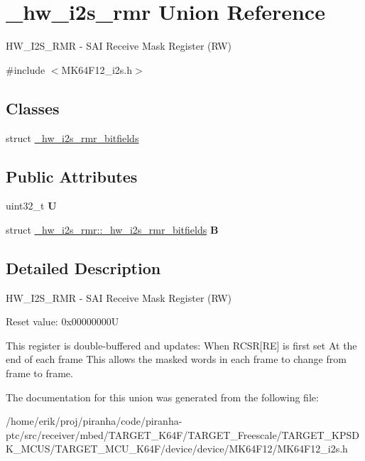\hypertarget{union__hw__i2s__rmr}{}\section{\+\_\+hw\+\_\+i2s\+\_\+rmr Union Reference}
\label{union__hw__i2s__rmr}


H\+W\+\_\+\+I2\+S\+\_\+\+R\+MR -\/ S\+AI Receive Mask Register (RW)  




{\ttfamily \#include $<$M\+K64\+F12\+\_\+i2s.\+h$>$}

\subsection*{Classes}
\begin{DoxyCompactItemize}
\item 
struct \hyperlink{struct__hw__i2s__rmr_1_1__hw__i2s__rmr__bitfields}{\+\_\+hw\+\_\+i2s\+\_\+rmr\+\_\+bitfields}
\end{DoxyCompactItemize}
\subsection*{Public Attributes}
\begin{DoxyCompactItemize}
\item 
uint32\+\_\+t {\bfseries U}\hypertarget{union__hw__i2s__rmr_a3553bafa8137608bc4874e0afd4a54c0}{}\label{union__hw__i2s__rmr_a3553bafa8137608bc4874e0afd4a54c0}

\item 
struct \hyperlink{struct__hw__i2s__rmr_1_1__hw__i2s__rmr__bitfields}{\+\_\+hw\+\_\+i2s\+\_\+rmr\+::\+\_\+hw\+\_\+i2s\+\_\+rmr\+\_\+bitfields} {\bfseries B}\hypertarget{union__hw__i2s__rmr_a1937cc447034b6cd1c011da008498b1c}{}\label{union__hw__i2s__rmr_a1937cc447034b6cd1c011da008498b1c}

\end{DoxyCompactItemize}


\subsection{Detailed Description}
H\+W\+\_\+\+I2\+S\+\_\+\+R\+MR -\/ S\+AI Receive Mask Register (RW) 

Reset value\+: 0x00000000U

This register is double-\/buffered and updates\+: When R\+C\+SR\mbox{[}RE\mbox{]} is first set At the end of each frame This allows the masked words in each frame to change from frame to frame. 

The documentation for this union was generated from the following file\+:\begin{DoxyCompactItemize}
\item 
/home/erik/proj/piranha/code/piranha-\/ptc/src/receiver/mbed/\+T\+A\+R\+G\+E\+T\+\_\+\+K64\+F/\+T\+A\+R\+G\+E\+T\+\_\+\+Freescale/\+T\+A\+R\+G\+E\+T\+\_\+\+K\+P\+S\+D\+K\+\_\+\+M\+C\+U\+S/\+T\+A\+R\+G\+E\+T\+\_\+\+M\+C\+U\+\_\+\+K64\+F/device/device/\+M\+K64\+F12/M\+K64\+F12\+\_\+i2s.\+h\end{DoxyCompactItemize}
